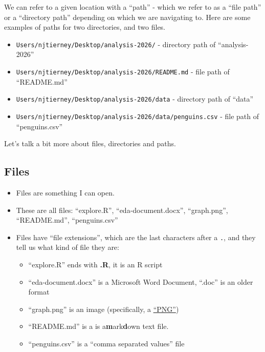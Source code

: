 \documentclass[
  letterpaper,
  justified,
  a4paper]{tufte-book}
\providecommand{\tightlist}{%
  \setlength{\itemsep}{0pt}\setlength{\parskip}{0pt}}
\providecommand{\tightlist}{%
  \setlength{\itemsep}{0pt}\setlength{\parskip}{0pt}}
\begin{document}
We can refer to a given location with a ``path'' - which we refer to as
a ``file path'' or a ``directory path'' depending on which we are
navigating to. Here are some examples of paths for two directories, and
two files.

\begin{itemize}
\tightlist
\item
  \texttt{Users/njtierney/Desktop/analysis-2026/} - directory path of
  ``analysis-2026''
\item
  \texttt{Users/njtierney/Desktop/analysis-2026/README.md} - file path
  of ``README.md''
\item
  \texttt{Users/njtierney/Desktop/analysis-2026/data} - directory path
  of ``data''
\item
  \texttt{Users/njtierney/Desktop/analysis-2026/data/penguins.csv} -
  file path of ``penguins.csv''
\end{itemize}

Let's talk a bit more about files, directories and paths.

\subsection{Files 📄}\label{files}

\begin{itemize}
\tightlist
\item
  Files are something I can open.
\item
  These are all files: ``explore.R'', ``eda-document.docx'',
  ``graph.png'', ``README.md'', ``penguins.csv''
\item
  Files have ``file extensions'', which are the last characters after a
  \texttt{.}, and they tell us what kind of file they are:

  \begin{itemize}
  \tightlist
  \item
    ``explore.R'' ends with \textbf{.R}, it is an R script
  \item
    ``eda-document.docx'' is a Microsoft Word Document, ``.doc'' is an
    older format
  \item
    ``graph.png'' is an image (specifically, a
    \href{https://en.wikipedia.org/wiki/PNG}{``PNG''})
  \item
    ``README.md'' is a is a\textbf{m}ark\textbf{d}own text file.
  \item
    ``penguins.csv'' is a ``comma separated values'' file
  \end{itemize}
\end{itemize}
\end{document}
